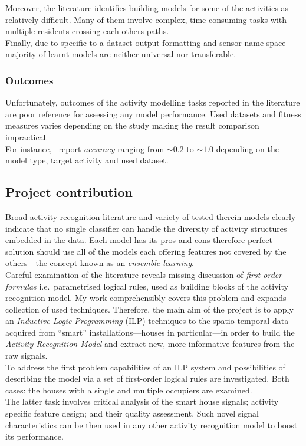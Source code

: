 \documentclass[10pt, a4paper, pdflatex, leqno, twoside, openright]{report}
\begin{document}
Moreover, the literature identifies building models for some of the activities as relatively difficult. Many of them involve complex, time consuming tasks with multiple residents crossing each others paths.\\

Finally, due to specific to a dataset output formatting and sensor name-space majority of learnt models are neither universal nor transferable.

      \subsubsection{Outcomes}
Unfortunately, outcomes of the activity modelling tasks reported in the literature are poor reference for assessing any model performance. Used datasets and fitness measures varies depending on the study making the result comparison impractical.\\
For instance,~\citet{fatima2013analysis} report \emph{accuracy} ranging from $\sim0.2$ to $\sim1.0$ depending on the model type, target activity and used dataset.

    \subsection{Project contribution}
Broad activity recognition literature and variety of tested therein models clearly indicate that no single classifier can handle the diversity of activity structures embedded in the data. Each model has its pros and cons therefore perfect solution should use all of the models each offering features not covered by the others---the concept known as an \emph{ensemble learning}.\\

Careful examination of the literature reveals missing discussion of \emph{first-order formulas} i.e.\ parametrised logical rules, used as building blocks of the activity recognition model. My work comprehensibly covers this problem and expands collection of used techniques. Therefore, the main aim of the project is to apply an \emph{Inductive Logic Programming} (ILP) techniques to the spatio-temporal data acquired from ``smart'' installations---houses in particular---in order to build the \emph{Activity Recognition Model} and extract new, more informative features from the raw signals.\\

To address the first problem capabilities of an ILP system and possibilities of describing the model via a set of first-order logical rules are investigated. Both cases: the houses with a single and multiple occupiers are examined.\\
The latter task involves critical analysis of the smart house signals; activity specific feature design; and their quality assessment. Such novel signal characteristics can be then used in any other activity recognition model to boost its performance.\\
\end{document}
